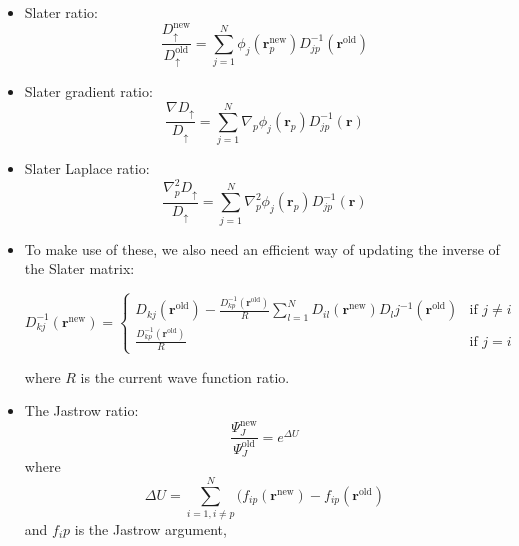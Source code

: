 \documentclass[aps,prb,twocolumn,floatfix]{revtex4}
\renewcommand{\vec}{\mathbf}
\begin{document}
\begin{itemize}
        \item Slater ratio: 
        \begin{equation}
            \frac{D_{\uparrow}^{\text{new}}}{D_{\uparrow}^{\text{old}}} = \sum_{j=1}^N \phi_j(\vec r_p^{\text{new}}) D_{jp}^{-1}( \vec r^{\text{old}} ) 
        \end{equation}
        \item Slater gradient ratio:
        \begin{equation}
            \frac{\nabla D_{\uparrow}}{D_{\uparrow}} = \sum_{j=1}^N \nabla_p \phi_j(\vec r_p) D_{jp}^{-1}( \vec r ) 
        \end{equation}
        \item Slater Laplace ratio: 
        \begin{equation} 
            \frac{\nabla^2_p D_{\uparrow}}{D_{\uparrow}} = \sum_{j=1}^N \nabla_p^2 \phi_j(\vec r_p) D_{jp}^{-1}( \vec r ) 
        \end{equation}
        \item To make use of these, we also need an efficient way of updating the inverse of the Slater matrix:
\begin{widetext}
        \begin{equation}
            D_{kj}^{-1}(\vec r^{\text{new}}) = \left \{ 
            \begin{array}{lr}
                D_{kj}(\vec r^{\text{old}}) - \frac{D^{-1}_{kp}(\vec r^{\text{old}})}{R} \sum_{l=1}^{N} D_{il}(\vec r^{\text{new}}) D_lj^{-1}(\vec r^{\text{old}}) & \text{if } j \neq i \\
                \frac{D^{-1}_{kp}(\vec r^{\text{old}})}{R} & \text{if } j = i
            \end{array}
 \right .
        \end{equation} 
\end{widetext}
        where $R$ is the current wave function ratio.
        \item The Jastrow ratio:
        \begin{equation}
            \frac{\Psi_J^{\text{new}}}{\Psi_J^{\text{old}}} = e^{\Delta U}
        \end{equation} 
        where
        \begin{equation}
            \Delta U = \sum_{i=1,i\neq p}^{N} (f_{ip}(\vec r^{\text{new}}) - f_{ip}(\vec r^{\text{old}}) 
        \end{equation}
        and $f_ip$ is the Jastrow argument,
        \begin{equation}

\end{equation}
\end{itemize}
\end{document}
